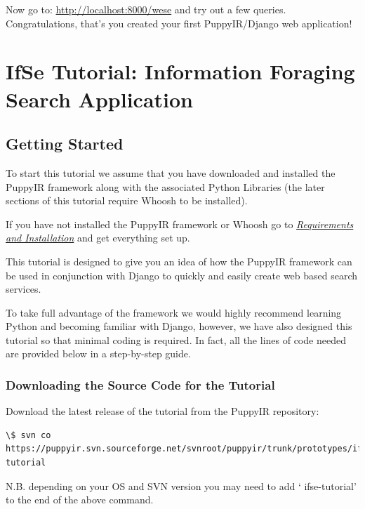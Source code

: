 \documentclass[letterpaper,10pt,english]{sphinxmanual}
\begin{document}
Now go to: \href{http://localhost:8000/wese}{http://localhost:8000/wese} and try out a few queries. Congratulations, that's you created your first PuppyIR/Django web application!


\section{IfSe Tutorial: Information Foraging Search Application}
\label{ifse-tutorial:information-foraging-puppyir-tutorial}\label{ifse-tutorial::doc}\label{ifse-tutorial:ifse-tutorial-information-foraging-search-application}

\subsection{Getting Started}
\label{ifse-tutorial:getting-started}
To start this tutorial we assume that you have downloaded and installed the PuppyIR framework along with the associated Python Libraries (the later sections of this tutorial require Whoosh to be installed).

If you have not installed the PuppyIR framework or Whoosh go to {\hyperref[installation:requirements-and-installation]{\emph{Requirements and Installation}}} and get everything set up.

This tutorial is designed to give you an idea of how the PuppyIR framework can be used in conjunction with Django to quickly and easily create web based search services.

To take full advantage of the framework we would highly recommend learning Python and becoming familiar with Django, however, we have also designed this tutorial so that minimal coding is required. In fact, all the lines of code needed are provided below in a step-by-step guide.


\subsubsection{Downloading the Source Code for the Tutorial}
\label{ifse-tutorial:downloading-the-source-code-for-the-tutorial}
Download the latest release of the tutorial from the PuppyIR repository:

\begin{Verbatim}[commandchars=\\\{\}]
\$ svn co https://puppyir.svn.sourceforge.net/svnroot/puppyir/trunk/prototypes/ifse-tutorial
\end{Verbatim}

N.B. depending on your OS and SVN version you may need to add ` ifse-tutorial' to the end of the above command.
\end{document}
